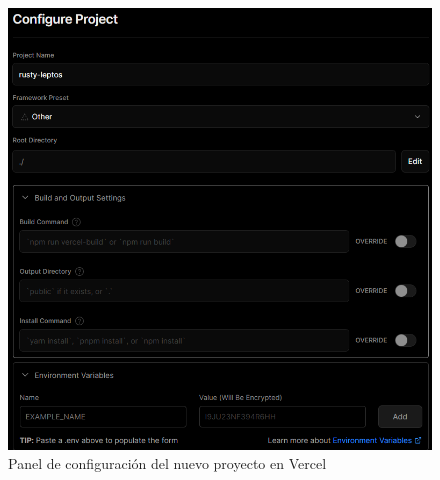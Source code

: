 \begin{figure}
    \centering
    \includegraphics{images/vercelConfig.png}
    \caption{Panel de configuración del nuevo proyecto en Vercel}
    \label{fig:vercelConfig}
\end{figure}